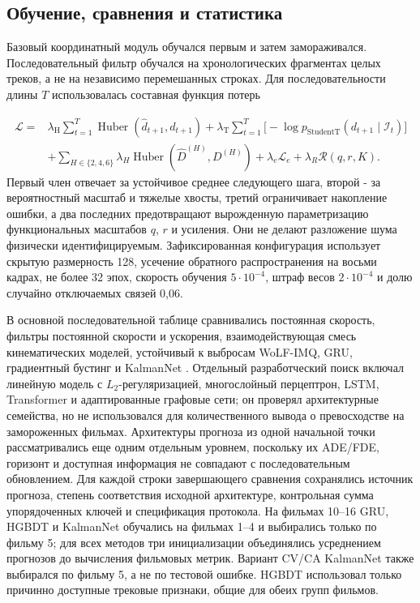 \documentclass[11pt,a4paper]{article}
\begin{document}
\subsection{Обучение, сравнения и статистика}
Базовый координатный модуль обучался первым и затем замораживался. Последовательный фильтр обучался на хронологических фрагментах целых треков, а не на независимо перемешанных строках. Для последовательности длины $T$ использовалась составная функция потерь

\begin{equation}
\begin{aligned}
\mathcal L={}&
\lambda_{\mathrm H}\sum_{t=1}^{T}
\operatorname{Huber}(\widehat d_{t+1},d_{t+1})
+\lambda_{\mathrm T}\sum_{t=1}^{T}
\big[-\log p_{\mathrm{StudentT}}(d_{t+1}\mid\mathcal I_t)\big]\\
&+\sum_{H\in\{2,4,6\}}\lambda_H
\operatorname{Huber}(\widehat D^{(H)},D^{(H)})
+\lambda_e\mathcal L_{e}
+\lambda_R\mathcal R(q,r,K).
\end{aligned}
\end{equation}
Первый член отвечает за устойчивое среднее следующего шага, второй - за вероятностный масштаб и тяжелые хвосты, третий ограничивает накопление ошибки, а два последних предотвращают вырожденную параметризацию функциональных масштабов $q$, $r$ и усиления. Они не делают разложение шума физически идентифицируемым. Зафиксированная конфигурация использует скрытую размерность 128, усечение обратного распространения на восьми кадрах, не более 32 эпох, скорость обучения $5\cdot10^{-4}$, штраф весов $2\cdot10^{-4}$ и долю случайно отключаемых связей 0,06.

В основной последовательной таблице сравнивались постоянная скорость, фильтры постоянной скорости и ускорения, взаимодействующая смесь кинематических моделей, устойчивый к выбросам WoLF-IMQ, GRU, градиентный бустинг и KalmanNet \cite{ref6,ref7}. Отдельный разработческий поиск включал линейную модель с $L_2$-регуляризацией, многослойный перцептрон, LSTM, Transformer и адаптированные графовые сети; он проверял архитектурные семейства, но не использовался для количественного вывода о превосходстве на замороженных фильмах. Архитектуры прогноза из одной начальной точки рассматривались еще одним отдельным уровнем, поскольку их ADE/FDE, горизонт и доступная информация не совпадают с последовательным обновлением. Для каждой строки завершающего сравнения сохранялись источник прогноза, степень соответствия исходной архитектуре, контрольная сумма упорядоченных ключей и спецификация протокола. На фильмах 10--16 GRU, HGBDT и KalmanNet обучались на фильмах 1--4 и выбирались только по фильму 5; для всех методов три инициализации объединялись усреднением прогнозов до вычисления фильмовых метрик. Вариант CV/CA KalmanNet также выбирался по фильму 5, а не по тестовой ошибке. HGBDT использовал только причинно доступные трековые признаки, общие для обеих групп фильмов.
\end{document}
